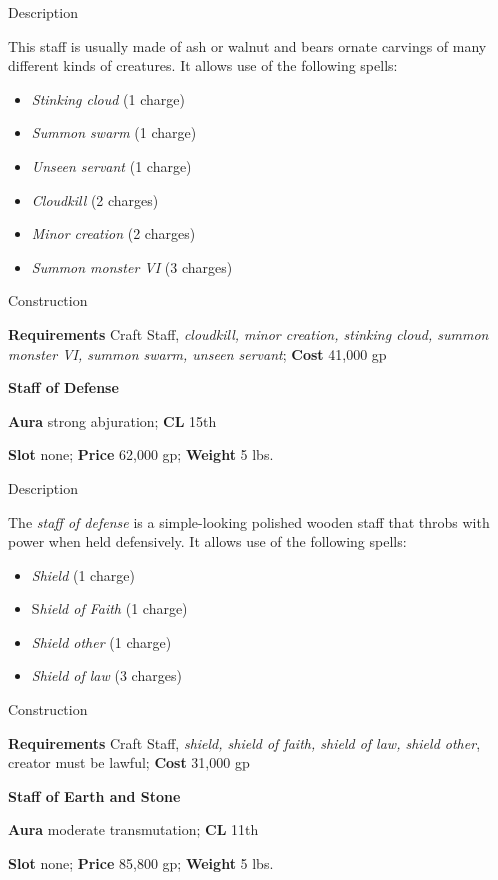 Description
				
This staff is usually made of ash or walnut and bears ornate carvings of many different kinds of creatures. It allows use of the following spells:
				\begin{itemize}\item  \textit{Stinking cloud} (1 charge)
				\item  \textit{Summon swarm} (1 charge)
				\item  \textit{Unseen servant} (1 charge)
				\item  \textit{Cloudkill} (2 charges)
				\item  \textit{Minor creation} (2 charges)
				\item  \textit{Summon monster VI} (3 charges) 
\end{itemize}
				
Construction
				
\textbf{Requirements} Craft Staff, \textit{cloudkill, minor creation, stinking cloud, summon monster VI, summon swarm, unseen servant}; \textbf{Cost }41,000 gp
				
\textbf{Staff of Defense}
				
\textbf{Aura} strong abjuration;\textbf{ CL }15th
				
\textbf{Slot} none; \textbf{Price} 62,000 gp; \textbf{Weight} 5 lbs.
				
Description
				
The \textit{staff of defense }is a simple-looking polished wooden staff that throbs with power when held defensively. It allows use of the following spells:
				\begin{itemize}\item  \textit{Shield} (1 charge)
				\item  S\textit{hield of Faith} (1 charge)
				\item  \textit{Shield other} (1 charge)
				\item  \textit{Shield of law} (3 charges) 
\end{itemize}
				
Construction
				
\textbf{Requirements} Craft Staff, \textit{shield, shield of faith, shield of law, shield other}, creator must be lawful; \textbf{Cost }31,000 gp
				
\textbf{Staff of Earth and Stone}
				
\textbf{Aura} moderate transmutation;\textbf{ CL }11th
				
\textbf{Slot} none; \textbf{Price} 85,800 gp; \textbf{Weight} 5 lbs.
				
